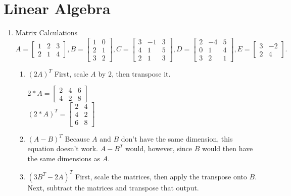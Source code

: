 \documentclass{article}
\begin{document}
    \section{Linear Algebra}
    \begin{enumerate}
        \item Matrix Calculations
        $$ 
        A = \begin{bmatrix} 1 & 2& 3\\ 2 & 1 & 4 \end{bmatrix},
        B = \begin{bmatrix} 1 & 0 \\ 2 & 1 \\ 3 & 2\end{bmatrix}, 
        C = \begin{bmatrix} 3 & -1 & 3 \\ 4 & 1 & 5\\ 2 & 1 & 3 \end{bmatrix}, 
        D = \begin{bmatrix} 2 & -4 & 5 \\ 0 & 1 & 4\\ 3 & 2 & 1 \end{bmatrix}, 
        E = \begin{bmatrix} 3 & -2 \\ 2 & 4 \end{bmatrix}.
        $$
        \begin{enumerate}
            \item $(2A)^T$
                First, scale $A$ by 2, then transpose it.
                \begin{center}
                    $2*A = \begin{bmatrix} 2 & 4& 6\\ 4 & 2 & 8 \end{bmatrix}$\\
                    $(2*A)^T = \begin{bmatrix} 2 & 4 \\ 4 & 2\\ 6 & 8 \end{bmatrix}$
                \end{center}
            \item $(A-B)^T$
                Because $A$ and $B$ don't have the same dimension, this equation doesn't work. $A - B^T$ would, however, since $B$ would
                then have the same dimensions as $A$.
            \item $(3B^T - 2A)^T$
                First, scale the matrices, then apply the transpose onto $B$. Next, subtract the matrices and transpose that output.

\end{enumerate}
\end{enumerate}
\end{document}
